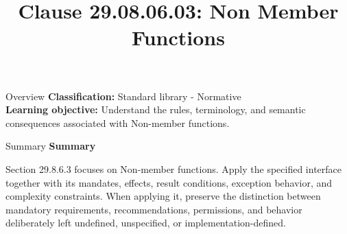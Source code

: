 \documentclass[10pt,letterpaper]{article}
\title{Clause 29.08.06.03: Non Member Functions}
\author{}
\date{}
\begin{document}
\maketitle
\begin{CornellOverviewBox}{Overview}
\textbf{Classification:} Standard library - Normative\\[2pt]
\textbf{Learning objective:} Understand the rules, terminology, and semantic consequences associated with Non-member functions.
\end{CornellOverviewBox}\begin{CornellSummaryBox}{Summary}
{\sffamily\bfseries\color{Accent} Summary}\par\vspace{3pt}Section 29.8.6.3 focuses on Non-member functions. Apply the specified interface together with its mandates, effects, result conditions, exception behavior, and complexity constraints. When applying it, preserve the distinction between mandatory requirements, recommendations, permissions, and behavior deliberately left undefined, unspecified, or implementation-defined.
\end{CornellSummaryBox}
\end{document}
